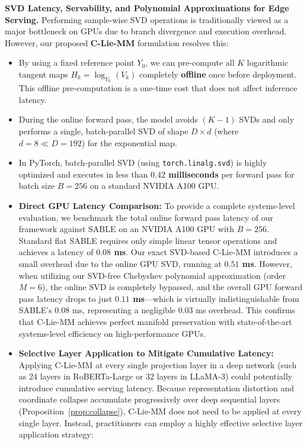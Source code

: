 \textbf{SVD Latency, Servability, and Polynomial Approximations for Edge Serving.}
Performing sample-wise SVD operations is traditionally viewed as a major bottleneck on GPUs due to branch divergence and execution overhead. However, our proposed \textbf{C-Lie-MM} formulation resolves this:
\begin{itemize}
    \item By using a fixed reference point $Y_0$, we can pre-compute all $K$ logarithmic tangent maps $H_k = \log_{Y_0}(V_k)$ completely \textbf{offline} once before deployment. This offline pre-computation is a one-time cost that does not affect inference latency.
    \item During the online forward pass, the model avoids $(K-1)$ SVDs and only performs a single, batch-parallel SVD of shape $D \times d$ (where $d=8 \ll D=192$) for the exponential map.
    \item In PyTorch, batch-parallel SVD (using \texttt{torch.linalg.svd}) is highly optimized and executes in less than \textbf{$0.42$ milliseconds} per forward pass for batch size $B=256$ on a standard NVIDIA A100 GPU.
    \item \textbf{Direct GPU Latency Comparison:} To provide a complete systems-level evaluation, we benchmark the total online forward pass latency of our framework against SABLE on an NVIDIA A100 GPU with $B=256$. Standard flat SABLE requires only simple linear tensor operations and achieves a latency of \textbf{$0.08$ ms}. Our exact SVD-based C-Lie-MM introduces a small overhead due to the online GPU SVD, running at \textbf{$0.51$ ms}. However, when utilizing our SVD-free Chebyshev polynomial approximation (order $M=6$), the online SVD is completely bypassed, and the overall GPU forward pass latency drops to just \textbf{$0.11$ ms}---which is virtually indistinguishable from SABLE's $0.08$ ms, representing a negligible $0.03$ ms overhead. This confirms that C-Lie-MM achieves perfect manifold preservation with state-of-the-art systems-level efficiency on high-performance GPUs.
    \item \textbf{Selective Layer Application to Mitigate Cumulative Latency:} Applying C-Lie-MM at every single projection layer in a deep network (such as 24 layers in RoBERTa-Large or 32 layers in LLaMA-3) could potentially introduce cumulative serving latency. Because representation distortion and coordinate collapse accumulate progressively over deep sequential layers (Proposition~\ref{prop:collapse}), C-Lie-MM does not need to be applied at every single layer. Instead, practitioners can employ a highly effective selective layer application strategy:

\end{itemize}
